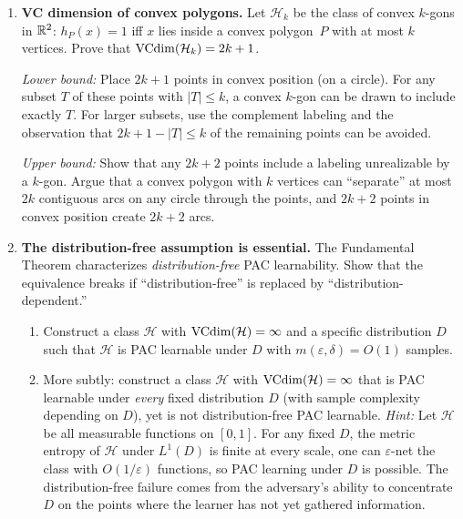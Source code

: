 \begin{enumerate}[leftmargin=*,itemsep=6pt]

\item \textbf{VC dimension of convex polygons.}
  Let $\mathcal{H}_k$ be the class of convex $k$-gons in $\mathbb{R}^2$:
  $h_P(x) = 1$ iff $x$ lies inside a convex polygon~$P$ with at
  most $k$ vertices.  Prove that $\mathrm{VCdim}(\mathcal{H}_k) = 2k + 1$.

  \emph{Lower bound:} Place $2k+1$ points in convex position
  (on a circle).  For any subset $T$ of these points with
  $|T| \leq k$, a convex $k$-gon can be drawn to include exactly
  $T$.  For larger subsets, use the complement labeling and the
  observation that $2k+1 - |T| \leq k$ of the remaining points
  can be avoided.

  \emph{Upper bound:} Show that any $2k+2$ points include a
  labeling unrealizable by a $k$-gon.  Argue that a convex
  polygon with $k$ vertices can ``separate'' at most $2k$
  contiguous arcs on any circle through the points, and $2k+2$
  points in convex position create $2k+2$ arcs.

\item \textbf{The distribution-free assumption is essential.}
  The Fundamental Theorem characterizes \emph{distribution-free}
  PAC learnability.  Show that the equivalence breaks if
  ``distribution-free'' is replaced by ``distribution-dependent.''
  \begin{enumerate}[label=(\alph*)]
  \item Construct a class $\mathcal{H}$ with $\mathrm{VCdim}(\mathcal{H}) =
    \infty$ and a specific distribution $D$ such that $\mathcal{H}$
    is PAC learnable under $D$ with $m(\varepsilon, \delta) = O(1)$
    samples.
  \item More subtly: construct a class $\mathcal{H}$ with
    $\mathrm{VCdim}(\mathcal{H}) = \infty$ that is PAC learnable under
    \emph{every} fixed distribution $D$ (with sample complexity
    depending on $D$), yet is not distribution-free PAC learnable.
    \emph{Hint:}  Let $\mathcal{H}$ be all measurable functions on
    $[0,1]$.  For any fixed $D$, the metric entropy of $\mathcal{H}$
    under $L^1(D)$ is finite at every scale, one can $\varepsilon$-net
    the class with $O(1/\varepsilon)$ functions, so PAC learning
    under $D$ is possible.  The distribution-free failure comes from
    the adversary's ability to concentrate $D$ on the points where
    the learner has not yet gathered information.
  \end{enumerate}


\end{enumerate}

